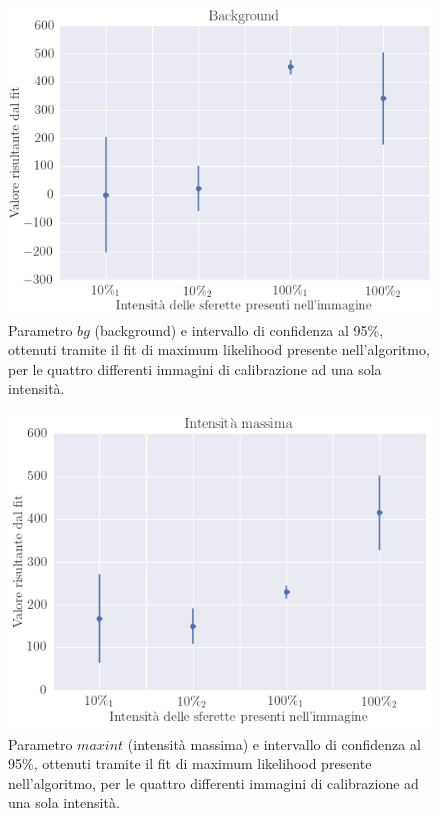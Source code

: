 \begin{figure}
 \centering
 \includegraphics[scale=.50]{img/CAP4bg.png}
 \caption{\small{Parametro $bg$ (background) e intervallo di confidenza al 95\%, ottenuti tramite il fit di maximum likelihood presente nell'algoritmo, per le quattro differenti immagini di calibrazione ad una sola intensità.}}
 \label{fig:bg}
\end{figure}

\begin{figure}
 \centering
 \includegraphics[scale=.50]{img/CAP4intmax.png}
 \caption{\small{Parametro $maxint$ (intensità massima) e intervallo di confidenza al 95\%, ottenuti tramite il fit di maximum likelihood presente nell'algoritmo, per le quattro differenti immagini di calibrazione ad una sola intensità.}}
 \label{fig:intmax}
\end{figure}

